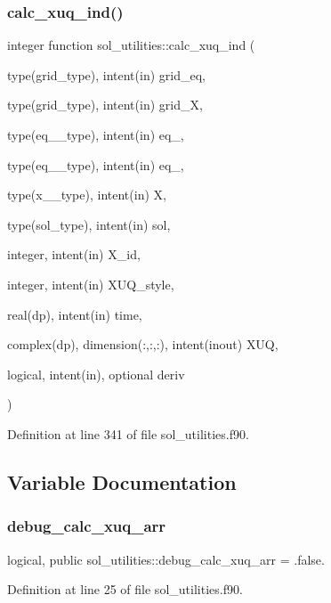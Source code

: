 \subsubsection{\texorpdfstring{calc\+\_\+xuq\+\_\+ind()}{calc\_xuq\_ind()}}
{\footnotesize\ttfamily integer function sol\+\_\+utilities\+::calc\+\_\+xuq\+\_\+ind (\begin{DoxyParamCaption}\item[{type(grid\+\_\+type), intent(in)}]{grid\+\_\+eq,  }\item[{type(grid\+\_\+type), intent(in)}]{grid\+\_\+X,  }\item[{type(eq\+\_\+1\+\_\+type), intent(in)}]{eq\+\_,  }\item[{type(eq\+\_\+2\+\_\+type), intent(in)}]{eq\+\_,  }\item[{type(x\+\_\+1\+\_\+type), intent(in)}]{X,  }\item[{type(sol\+\_\+type), intent(in)}]{sol,  }\item[{integer, intent(in)}]{X\+\_\+id,  }\item[{integer, intent(in)}]{X\+U\+Q\+\_\+style,  }\item[{real(dp), intent(in)}]{time,  }\item[{complex(dp), dimension(\+:,\+:,\+:), intent(inout)}]{X\+UQ,  }\item[{logical, intent(in), optional}]{deriv }\end{DoxyParamCaption})}



Definition at line 341 of file sol\+\_\+utilities.\+f90.



\subsection{Variable Documentation}
\mbox{\label{namespacesol__utilities_a4779ff845b4ddc046892bf4eb4490dd2}} 
\subsubsection{\texorpdfstring{debug\+\_\+calc\+\_\+xuq\+\_\+arr}{debug\_calc\_xuq\_arr}}
{\footnotesize\ttfamily logical, public sol\+\_\+utilities\+::debug\+\_\+calc\+\_\+xuq\+\_\+arr = .false.}



Definition at line 25 of file sol\+\_\+utilities.\+f90.

